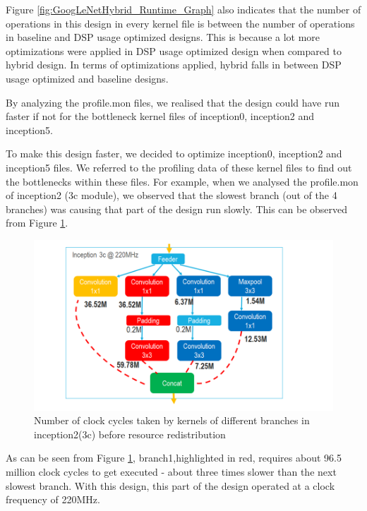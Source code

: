 Figure \ref{fig:GoogLeNetHybrid_Runtime_Graph} also indicates that the number of operations in this design in every kernel file is between the number of operations in baseline and DSP usage optimized designs. This is because a lot more optimizations were applied in DSP usage optimized design when compared to hybrid design. In terms of optimizations applied, hybrid falls in between DSP usage optimized and baseline designs.

By analyzing the profile.mon files, we realised that the design could have run faster if not for the bottleneck kernel files of inception0, inception2 and inception5.

To make this design faster, we decided to optimize inception0, inception2 and inception5 files. We referred to the profiling data of these kernel files to find out the bottlenecks within these files. For example, when we analysed the profile.mon of inception2 (3c module), we observed that the slowest branch (out of the 4 branches) was causing that part of the design run slowly. This can be observed from Figure  \ref{fig:GoogLeNet_Hybrid_Before_Opt}. 

 \begin{figure}[!htb]
  \includegraphics[width=\textwidth,height=\textheight,keepaspectratio]{img/GoogLeNet_Hybrid_Before_Opt.PNG}
  \caption{Number of clock cycles taken by kernels of different branches in inception2(3c) before resource redistribution}
  \label{fig:GoogLeNet_Hybrid_Before_Opt}
\end{figure}


As can be seen from Figure  \ref{fig:GoogLeNet_Hybrid_Before_Opt}, branch1,highlighted in red, requires about 96.5 million clock cycles to get executed - about three times slower than the next slowest branch.  With this design, this part of the design operated at a clock frequency of 220MHz.

